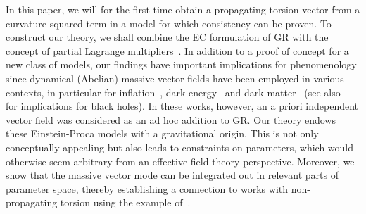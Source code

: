 \documentclass[aps,prd,reprint,preprintnumbers,showpacs,floatfix,nofootinbib,superscript address,longbibliography]{revtex4-1}
\begin{document}
In this paper, we will for the first time obtain a propagating torsion vector from a curvature-squared term in a model for which consistency can be proven. To construct our theory, we shall combine the EC formulation of GR with the concept of partial Lagrange multipliers~\cite{Barker:2022jsh}. In addition to a proof of concept for a new class of models, our findings have important implications for phenomenology since dynamical (Abelian) massive vector fields have been employed in various contexts, in particular for inflation~\cite{Ford:1989me,Golovnev:2008cf,Chiba:2008eh,Koivisto:2008xf,Kanno:2008gn,Emami:2016ldl}, dark energy~\cite{Armendariz-Picon:2004say,Koivisto:2007bp,Koivisto:2008xf,Tasinato:2014eka,DeFelice:2016yws,DeFelice:2016uil,BeltranJimenez:2016afo,deFelice:2017paw,Nakamura:2018oyy,Heisenberg:2020xak,Benisty:2021sul,deRham:2021efp} and dark matter~\cite{Hambye:2008bq,Hambye:2009fg,Arina:2009uq,Hisano:2010yh,Diaz-Cruz:2010czr,Lebedev:2011iq,Farzan:2012hh,Baek:2012se,Arcadi:2020jqf,Barman:2021qds} (see also~\cite{Bekenstein:1971hc,Heisenberg:2017hwb,Garcia-Saenz:2021uyv} for implications for black holes). In these works, however, an a priori independent vector field was considered as an ad hoc addition to GR. Our theory endows these Einstein-Proca models with a gravitational origin. This is not only conceptually appealing but also leads to constraints on parameters, which would otherwise seem arbitrary from an effective field theory perspective. Moreover, we show that the massive vector mode can be integrated out in relevant parts of parameter space, thereby establishing a connection to works with non-propagating torsion using the example of~\cite{Shaposhnikov:2020aen}.
\end{document}

